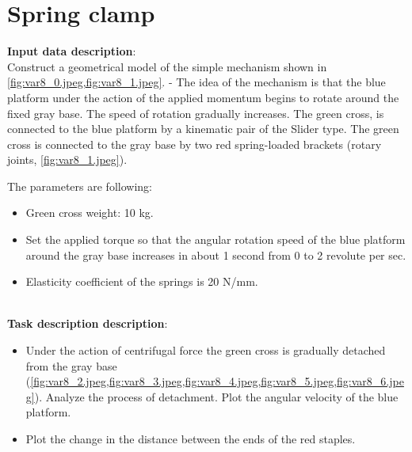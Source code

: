 \documentclass[12pt]{article}
\newcommand\ttask[3] 
 {
	\section*{#1}
	\textbf{Input data description}: \\ #2 \  \\
	\textbf{Task description description}: #3
	\newpage
 }
\begin{document}
\ttask{Spring clamp}{
	Construct a geometrical model of the simple mechanism shown in \cref{fig:var8_0.jpeg,fig:var8_1.jpeg}. 
	- The idea of the mechanism is that the blue platform under the action of the applied momentum begins to rotate around the fixed gray base. The speed of rotation gradually increases. The green cross, is connected to the blue platform by a kinematic pair of the Slider type. The green cross is connected to the gray base by two red spring-loaded brackets (rotary joints, \cref{fig:var8_1.jpeg}).

	The parameters are following:
	\begin{itemize}
		\item Green cross weight: 10 kg.
		\item Set the applied torque so that the angular rotation speed of the blue platform around the gray base increases in about 1 second from 0 to 2 revolute per sec.
		\item Elasticity coefficient of the springs is 20 N/mm.
	\end{itemize}
}{
	\begin{itemize}
		\item Under the action of centrifugal force the green cross is gradually detached from the gray base (\cref{fig:var8_2.jpeg,fig:var8_3.jpeg,fig:var8_4.jpeg,fig:var8_5.jpeg,fig:var8_6.jpeg}). Analyze the process of detachment. Plot the angular velocity of the blue platform.
		\item Plot the change in the distance between the ends of the red staples.
	\end{itemize}

}
\end{document}
